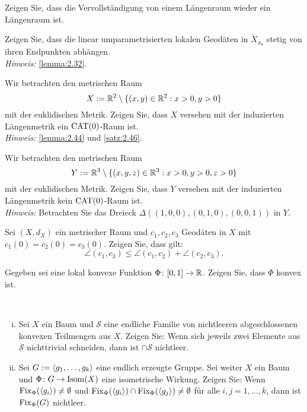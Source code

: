 	\begin{aufgabe}
		\label{aufg:5.5}	
		Zeigen Sie, dass die Vervollständigung von einem Längenraum wieder ein Längenraum ist.
	\end{aufgabe}
	
	\begin{aufgabe}
		\label{aufg:6.1}
		Zeigen Sie, dass die linear umparametrisierten lokalen Geodäten in $\tilde{X}_{x_0}$ stetig von ihren Endpunkten abhängen. \\
		\textit{Hinweis:} \autoref{lemma:2.32}.
	\end{aufgabe}
	
	\begin{aufgabe}
		\label{aufg:6.2}
		Wir betrachten den metrischen Raum
		\[
			X := \mathbb{R}^2 \setminus \{(x,y) \in \mathbb{R}^2 : x > 0, y>0\}
		\]
		mit der euklidischen Metrik.
		Zeigen Sie, dass $X$ versehen mit der induzierten Längenmetrik ein $\operatorname{CAT(0)}$-Raum ist. \\
		\textit{Hinweis:} \autoref{lemma:2.44} und \autoref{satz:2.46}.
	\end{aufgabe}
	
	\begin{aufgabe}
		\label{aufg:6.3}
		Wir betrachten den metrischen Raum
		\[
			Y := \mathbb{R}^3 \setminus \{(x,y,z) \in \mathbb{R}^3 : x > 0, y>0, z >0\}
		\]
		mit der euklidischen Metrik.
		Zeigen Sie, dass $Y$ versehen mit der induzierten Längenmetrik kein $\operatorname{CAT(0)}$-Raum ist. \\
		\textit{Hinweis:} Betrachten Sie das Dreieck $\Delta((1,0,0),(0,1,0),(0,0,1))$ in $Y$.
	\end{aufgabe}
	
	\begin{aufgabe}
		\label{aufg:6.4}
		Sei $(X,d_X)$ ein metrischer Raum und $c_1,c_2,c_3$ Geodäten in $X$ mit $c_1(0) = c_2(0) = c_3(0)$.
		Zeigen Sie, dass gilt:
		\[
			\angle(c_1,c_3) \leq \angle(c_1,c_2) + \angle(c_2,c_3).
		\]
	\end{aufgabe}
	
	\begin{aufgabe}
		\label{aufg:7.1}
		Gegeben sei eine lokal konvexe Funktion $\Phi\colon [0,1] \rightarrow \mathbb{R}$.
		Zeigen Sie, dass $\Phi$ konvex ist.
	\end{aufgabe}
	\newpage
	\begin{aufgabe}
		\label{aufg:7.2}
		\mbox{} \\[-1.3cm]
		\begin{enumerate}[(i)]
			\item Sei $X$ ein Baum und $\mathcal{S}$ eine endliche Familie von nichtleeren abgeschlossenen konvexen Teilmengen aus $X$.
			Zeigen Sie:
			Wenn sich jeweils zwei Elemente aus $\mathcal{S}$ nichttrivial schneiden, dann ist $\cap \mathcal{S}$ nichtleer.
			\item Sei $G:= \langle g_1,\dots,g_k\rangle$ eine endlich erzeugte Gruppe.
			Sei weiter $X$ ein Baum und $\Phi \colon G \rightarrow \operatorname{Isom}(X)$ eine isometrische Wirkung.
			Zeigen Sie:
			Wenn $\operatorname{Fix}_\Phi(\langle g_i\rangle) \neq \emptyset$ und $\operatorname{Fix}_\Phi(\langle g_i\rangle) \cap \operatorname{Fix}_\Phi(\langle g_j\rangle) \neq \emptyset$ für alle $i,j = 1,\dots,k$, dann ist $\operatorname{Fix}_\Phi(G)$ nichtleer.
		\end{enumerate}
	\end{aufgabe}
	
